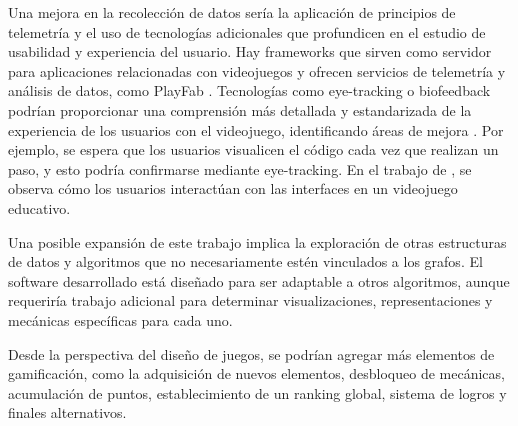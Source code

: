 Una mejora en la recolección de datos sería la aplicación de principios de telemetría y el uso de tecnologías adicionales que profundicen en el estudio de usabilidad y experiencia del usuario. Hay frameworks que sirven como servidor para aplicaciones relacionadas con videojuegos y ofrecen servicios de telemetría y análisis de datos, como PlayFab \cite{PlayFabTelemetry}. Tecnologías como eye-tracking o biofeedback podrían proporcionar una comprensión más detallada y estandarizada de la experiencia de los usuarios con el videojuego, identificando áreas de mejora \cite{Zain2011EyeTI}. Por ejemplo, se espera que los usuarios visualicen el código cada vez que realizan un paso, y esto podría confirmarse mediante eye-tracking. En el trabajo de \cite{Zain2011EyeTI}, se observa cómo los usuarios interactúan con las interfaces en un videojuego educativo.

Una posible expansión de este trabajo implica la exploración de otras estructuras de datos y algoritmos que no necesariamente estén vinculados a los grafos. El software desarrollado está diseñado para ser adaptable a otros algoritmos, aunque requeriría trabajo adicional para determinar visualizaciones, representaciones y mecánicas específicas para cada uno.

Desde la perspectiva del diseño de juegos, se podrían agregar más elementos de gamificación, como la adquisición de nuevos elementos, desbloqueo de mecánicas, acumulación de puntos, establecimiento de un ranking global, sistema de logros y finales alternativos.
